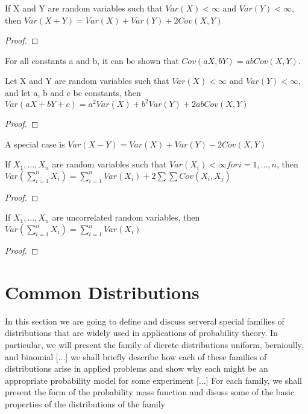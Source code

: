 \begin{proposition}
If X and Y are random variables such that $Var\left(X\right)<\infty$ and $Var\left(Y\right)<\infty$, then $Var\left(X+Y\right)=Var\left(X\right)+Var\left(Y\right)+2Cov\left(X,Y\right)$
\end{proposition}
\begin{proof}
\end{proof}

For all constants a and b, it can be shown that $Cov\left(aX,bY\right)=abCov\left(X,Y\right)$.

\begin{proposition}
Let X and Y are random variables such that $Var\left(X\right)<\infty$ and $Var\left(Y\right)<\infty$, and let a, b and c be constants, then $Var\left(aX+bY+c\right)=a^{2}Var\left(X\right)+b^{2}Var\left(Y\right)+2abCov\left(X,Y\right)$
\end{proposition}
\begin{proof}
\end{proof}

A special case is $Var\left(X-Y\right)=Var\left(X\right)+Var\left(Y\right)-2Cov\left(X,Y\right)$

\begin{proposition}
If $X_{1},\ldots,X_{n}$ are random variables such that $Var\left(X_{i}\right)<\infty for i=1,\ldots,n$, then $Var\left(\sum_{i=1}^{n}X_{i}\right)=\sum_{i=1}^{n}Var\left(X_{i}\right)+2\sum\sum Cov\left(X_{i},X_{j}\right)$
\end{proposition}
\begin{proof}
\end{proof}

\begin{proposition}
If $X_{1},\ldots,X_{n}$ are uncorrelated random variables, then $Var\left(\sum_{i=1}^{n}X_{i}\right)=\sum_{i=1}^{n}Var\left(X_{i}\right)$
\end{proposition}
\begin{proof}
\end{proof}


%
%

\section{Common Distributions}
\label{sec:probability_distributions}

{\color{red} In this section we are going to define and discuss serveral special families of distributions that are widely used in applications of probability theory. In particular, we will present the family of dicrete distributions uniform, bernioully, and binomial [...] we shall briefly describe how each of these families of distributions arise in applied problems and show why each might be an appropriate probability model for some experiment [...] For each family, we shall present the form of the probability mass function and disuss some of the basic properties of the distributions of the family} 

